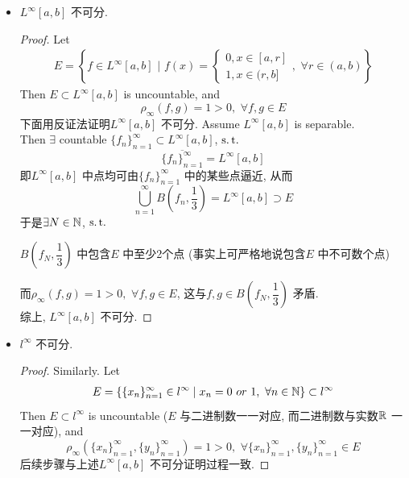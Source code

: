 \begin{example}
\begin{itemize}
			\item $L^{\infty}[a , b]$ 不可分.
			\begin{proof}
				Let
				\begin{align}
					E = \left\{ f \in L^{\infty}[a , b] \,\, \Big| \,\, f(x) = 
					\begin{cases}
						0 , x \in [a , r] \\
						1 , x \in (r , b]
					\end{cases} , \,\, \forall r \in (a , b) \right\}
				\end{align}
				Then $E \subset L^{\infty}[a , b]$ is uncountable, and
				\[ \rho_{\infty}(f , g) = 1 > 0 , \,\, \forall f , g \in E \]
				下面用反证法证明$L^{\infty}[a , b]$ 不可分. Assume $L^{\infty}[a , b]$ is separable. \\
				Then $\exists$ countable $\{ f_n \}_{n = 1}^{\infty} \subset L^{\infty}[a , b]$, $\operatorname{s.t.}$
				\[ \overline{\{ f_n \}_{n = 1}^{\infty}} = L^{\infty}[a , b] \]
				即$L^{\infty}[a , b]$ 中点均可由$\{ f_n \}_{n = 1}^{\infty}$ 中的某些点逼近, 从而
				\[ \bigcup_{n = 1}^{\infty}{B(f_n , \dfrac{1}{3})} = L^{\infty}[a , b] \supset E \]
				于是$\exists N \in \mathbb{N}$, $\operatorname{s.t.}$
				\begin{center}
					$B(f_N , \dfrac{1}{3})$ 中包含$E$ 中至少2个点 (事实上可严格地说包含$E$ 中不可数个点)
				\end{center}
				而$\rho_{\infty}(f , g) = 1 > 0 , \,\, \forall f , g \in E$, 这与$f , g \in B(f_N , \dfrac{1}{3})$ 矛盾. \\
				综上, $L^{\infty}[a , b]$ 不可分.
			\end{proof}
		
			\newpage
			
			\item $l^{\infty}$ 不可分.
			\begin{proof}
				Similarly. Let
				\begin{align}
					E = \left\{ \{ x_n \}_{n = 1}^{\infty} \in l^{\infty} \mid x_n = 0 \,\, or \,\, 1 , \,\, \forall n \in \mathbb{N} \right\} \subset l^{\infty}
				\end{align}
				Then $E \subset l^{\infty}$ is uncountable ($E$ 与二进制数一一对应, 而二进制数与实数$\mathbb{R}$ 一一对应), and
				\[ \rho_{\infty}(\{ x_n \}_{n = 1}^{\infty} , \{ y_n \}_{n = 1}^{\infty}) = 1 > 0 , \,\, \forall \{ x_n \}_{n = 1}^{\infty} , \{ y_n \}_{n = 1}^{\infty} \in E \]
				后续步骤与上述$L^{\infty}[a , b]$ 不可分证明过程一致.
			\end{proof}
		\end{itemize}
	\end{example}


